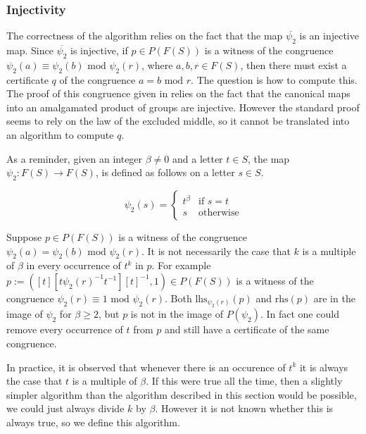 \documentclass[12pt]{article} %
\theoremstyle{definition}
\theoremstyle{definition}
\theoremstyle{definition}
\theoremstyle{definition}
\theoremstyle{definition}
\theoremstyle{definition}
\begin{document}
\subsubsection{Injectivity}\label{powproofs}

The correctness of the algorithm relies on the fact that the map
$\overline{\psi_2}$ is an injective map.
Since $\overline{\psi_2}$ is injective, if $p \in P(F(S))$ is a witness of the congruence
$\psi_2(a) \equiv \psi_2(b) \text{ mod } \psi_2(r)$, where $a, b, r \in F(S)$,
then there must exist a certificate
$q$ of the congruence $a = b \text{ mod }r$. The question is how to compute this. The proof
of this congruence given in \cite{PutmanOneRelator}
relies on the fact that the canonical maps into an amalgamated product
of groups are injective. However the standard proof
seems to rely on the law of the excluded middle, so
it cannot be translated into an algorithm to compute $q$.

As a reminder, given an integer $\beta \ne 0$ and a letter $t \in S$,
the map $\psi_2 : F(S) \to F(S)$, is defined as follows on a letter $s \in S$.

\begin{equation}
  \psi_2(s) =
  \begin{cases}
     t^\beta & \text{if } s = t \\
     s & \text{otherwise}
  \end{cases}
\end{equation}

Suppose $p \in P(F(S))$ is a witness of the congruence
$\psi_2(a) = \psi_2(b) \text{ mod } \psi_2(r)$. It is not necessarily the case that $k$
is a multiple of $\beta$ in every occurrence of $t^k$ in $p$. For example
$p := ([t][t\psi_2(r)^{-1}t^{-1}][t]^{-1}, 1) \in P(F(S))$ is a witness of the congruence
$\psi_2(r) \equiv 1 \text{ mod } \psi_2(r)$. Both $\text{lhs}_{\psi_2(r)}(p)$
and $\text{rhs}(p)$ are in the image of
$\psi_2$ for $\beta \ge 2$,
but $p$ is not in the image of $P(\psi_2)$. In fact
one could remove every occurrence of $t$ from $p$ and still have a certificate of the same
congruence.

In practice, it is observed that whenever there is an occurence of $t^k$ it is always
the case that $t$ is a multiple of $\beta$. If this were true all the time, then a slightly
simpler algorithm than the algorithm described in this section would be possible,
we could just always divide $k$ by $\beta$. However it is not known whether this is always
true, so we define this algorithm.
\end{document}
